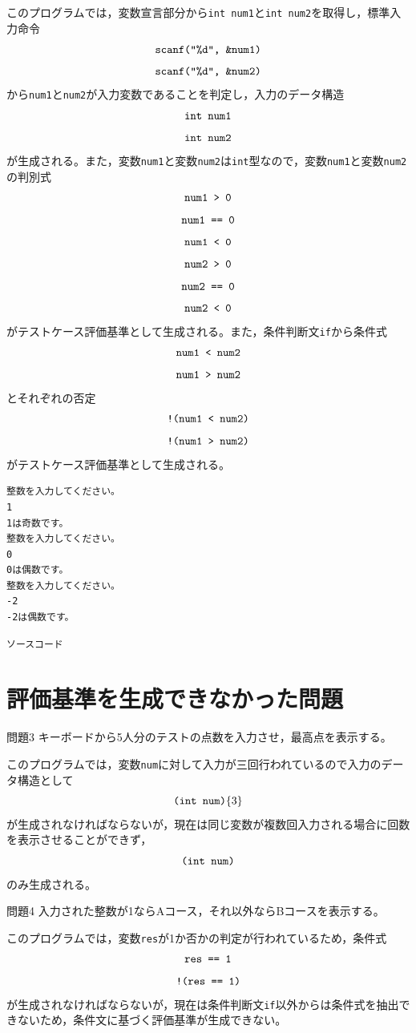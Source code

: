 \documentclass{tpu-sotu}
\begin{document}

このプログラムでは，変数宣言部分から{\tt int num1}と{\tt int num2}を取得し，標準入力命令\\
\[ 
\mbox{{\tt {scanf("\%d", \&num1)}}}
\]
\[ 
\mbox{{\tt {scanf("\%d", \&num2)}}}
\]
から{\tt num1}と{\tt num2}が入力変数であることを判定し，入力のデータ構造\\
\[
\mbox{{\tt int num1}}
\]
\[
\mbox{{\tt int num2}}
\]
が生成される。また，変数{\tt num1}と変数{\tt num2}は{\tt int}型なので，変数{\tt num1}と変数{\tt num2}の判別式\\
\[ 
\mbox{\tt{num1 > 0}} 
\]
\[
\mbox{\tt{num1 == 0}}
\]
\[
\mbox{\tt{num1 < 0}}
\]
\[ 
\mbox{\tt{num2 > 0}} 
\]
\[
\mbox{\tt{num2 == 0}}
\]
\[
\mbox{\tt{num2 < 0}}
\]
がテストケース評価基準として生成される。また，条件判断文{\tt if}から条件式\\
\[
\mbox{\tt{num1 < num2}}
\]
\[
\mbox{\tt{num1 > num2}}
\]
とそれぞれの否定\\
\[
\mbox{\tt{!(num1 < num2)}}
\]
\[
\mbox{\tt{!(num1 > num2)}}
\]
がテストケース評価基準として生成される。

\begin{lstlisting}[xleftmargin=1cm]
整数を入力してください。
1
1は奇数です。
整数を入力してください。
0
0は偶数です。
整数を入力してください。
-2
-2は偶数です。
\end{lstlisting}


\begin{lstlisting}[xleftmargin=1cm]
   ソースコード
\end{lstlisting}
\section{評価基準を生成できなかった問題}
\begin{itembox}[l]{問題3}
キーボードから5人分のテストの点数を入力させ，最高点を表示する。
\end{itembox}

このプログラムでは，変数{\tt num}に対して入力が三回行われているので入力のデータ構造として
\[
\mbox{{\tt (int num)}\{3\}}
\]
が生成されなければならないが，現在は同じ変数が複数回入力される場合に回数を表示させることができず，
\[
\mbox{{\tt (int num)}}
\]
のみ生成される。
\begin{itembox}[l]{問題4}
入力された整数が1ならAコース，それ以外ならBコースを表示する。
\end{itembox}

このプログラムでは，変数{\tt res}が1か否かの判定が行われているため，条件式
\[
\mbox{\tt{res == 1}}
\]
\[
\mbox{\tt{!(res == 1)}}
\]
が生成されなければならないが，現在は条件判断文{\tt if}以外からは条件式を抽出できないため，条件文に基づく評価基準が生成できない。
\end{document}
